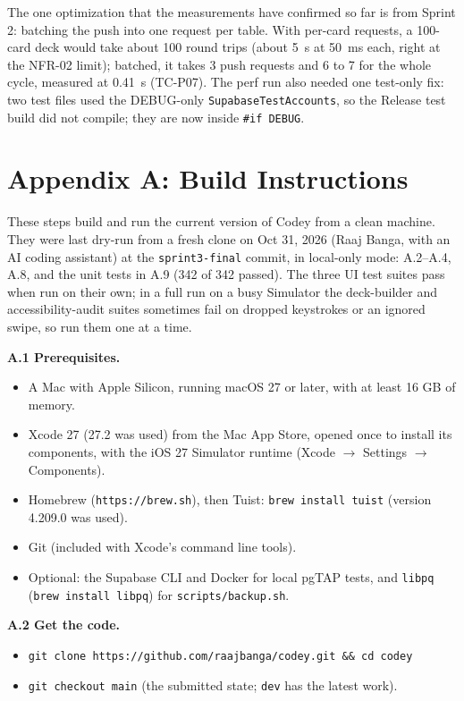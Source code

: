 \documentclass[12pt,letterpaper]{article}
\begin{document}
The one optimization that the measurements have confirmed so far is from Sprint 2:
batching the push into one request per table. With per-card requests, a 100-card
deck would take about 100 round trips (about 5~s at 50~ms each, right at the NFR-02
limit); batched, it takes 3 push requests and 6 to 7 for the whole cycle, measured at
0.41~s (TC-P07). The perf run also needed one test-only fix: two test files used the DEBUG-only
\texttt{SupabaseTestAccounts}, so the Release test build did not compile; they are now
inside \texttt{\#if DEBUG}.

\section*{Appendix A: Build Instructions}\label{sec:appA}
These steps build and run the current version of Codey from a clean machine. They
were last dry-run from a fresh clone on Oct 31, 2026 (Raaj Banga, with an AI coding
assistant) at the \texttt{sprint3-final} commit, in local-only mode: A.2--A.4, A.8, and the
unit tests in A.9 (342 of 342 passed). The three UI test suites pass when run on their own;
in a full run on a busy Simulator the deck-builder and accessibility-audit suites
sometimes fail on dropped keystrokes or an ignored swipe, so run them one at a time.

\textbf{A.1 Prerequisites.}
\begin{itemize}
  \item A Mac with Apple Silicon, running macOS 27 or later, with at least
        16 GB of memory.
  \item Xcode 27 (27.2 was used) from the Mac App Store, opened once to install its components, with
        the iOS 27 Simulator runtime (Xcode $\to$ Settings $\to$ Components).
  \item Homebrew (\texttt{https://brew.sh}), then Tuist:
        \texttt{brew install tuist} (version 4.209.0 was used).
  \item Git (included with Xcode's command line tools).
  \item Optional: the Supabase CLI and Docker for local pgTAP tests, and
        \texttt{libpq} (\texttt{brew install libpq}) for \texttt{scripts/backup.sh}.
\end{itemize}

\textbf{A.2 Get the code.}
\begin{itemize}
  \item \texttt{git clone https://github.com/raajbanga/codey.git \&\& cd codey}
  \item \texttt{git checkout main} (the submitted state; \texttt{dev} has the latest work).
\end{itemize}
\end{document}
